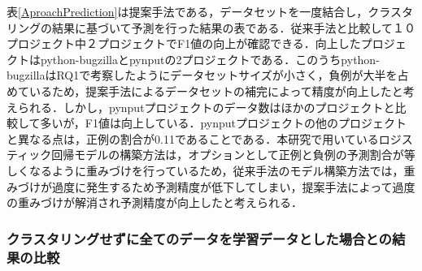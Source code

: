 \documentclass[T,J]{fose} %
\begin{document}
表\ref{AproachPrediction}は提案手法である，データセットを一度結合し，クラスタリングの結果に基づいて予測を行った結果の表である．従来手法と比較して１０プロジェクト中２プロジェクトでF1値の向上が確認できる．向上したプロジェクトはpython-bugzillaとpynputの2プロジェクトである．このうちpython-bugzillaはRQ1で考察したようにデータセットサイズが小さく，負例が大半を占めているため，提案手法によるデータセットの補完によって精度が向上したと考えられる．しかし，pynputプロジェクトのデータ数はほかのプロジェクトと比較して多いが，F1値は向上している．pynputプロジェクトの他のプロジェクトと異なる点は，正例の割合が0.11であることである．本研究で用いているロジスティック回帰モデルの構築方法は，オプションとして正例と負例の予測割合が等しくなるように重みづけを行っているため，従来手法のモデル構築方法では，重みづけが過度に発生するため予測精度が低下してしまい，提案手法によって過度の重みづけが解消され予測精度が向上したと考えられる．

\subsubsection{クラスタリングせずに全てのデータを学習データとした場合との結果の比較}
\end{document}
